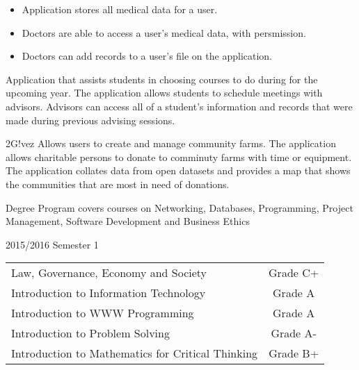 \documentclass[10pt,a4paper,normalphoto]{altacv}
\begin{document}

\begin{itemize}
\item Application stores all medical data for a user.
\item Doctors are able to access a user's medical data, with persmission.
\item Doctors can add records to a user's file on the application.
\end{itemize}

\divider

Application that assists students in choosing courses to do during for the upcoming year. The application allows 
students to schedule meetings with advisors. Advisors can access all of a student's information and records that were made
during previous advising sessions.\\

\divider

2G!vez Allows users to create and manage community farms. The application allows charitable persons to donate to comminuty farms with time or equipment. The application collates data from open datasets and provides a map that shows the communities that are most in need of donations.\\
\medskip

\clearpage



Degree Program covers courses on Networking, Databases, Programming, Project Management, Software Development and Business Ethics

\medskip

2015/2016 Semester 1

\medskip
\begin{tabular}{ l c }
Law, Governance, Economy and Society &  Grade C+\\
Introduction to Information Technology  & Grade A\\
Introduction to WWW Programming & Grade A\\
Introduction to Problem Solving & Grade A-\\
Introduction to Mathematics for Critical Thinking & Grade B+
\end{tabular}
\end{document}
